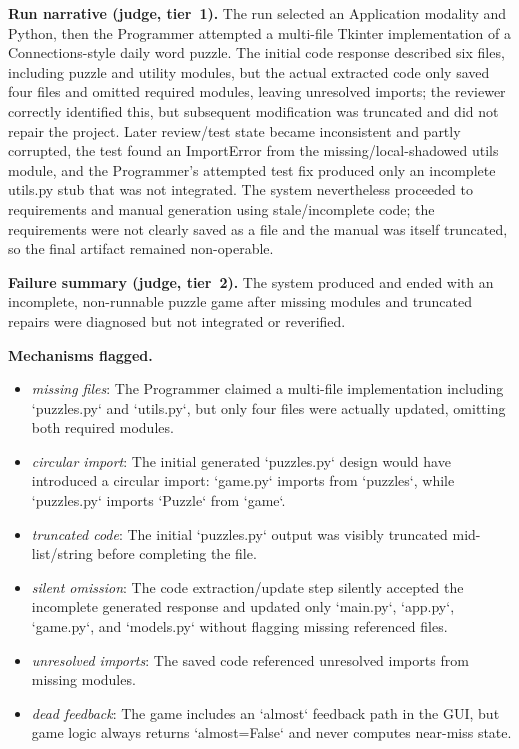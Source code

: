 \textbf{Run narrative (judge, tier~1).} The run selected an Application modality and Python, then the Programmer attempted a multi-file Tkinter implementation of a Connections-style daily word puzzle. The initial code response described six files, including puzzle and utility modules, but the actual extracted code only saved four files and omitted required modules, leaving unresolved imports; the reviewer correctly identified this, but subsequent modification was truncated and did not repair the project. Later review/test state became inconsistent and partly corrupted, the test found an ImportError from the missing/local-shadowed utils module, and the Programmer's attempted test fix produced only an incomplete utils.py stub that was not integrated. The system nevertheless proceeded to requirements and manual generation using stale/incomplete code; the requirements were not clearly saved as a file and the manual was itself truncated, so the final artifact remained non-operable.

\textbf{Failure summary (judge, tier~2).} The system produced and ended with an incomplete, non-runnable puzzle game after missing modules and truncated repairs were diagnosed but not integrated or reverified.

\textbf{Mechanisms flagged.}
\begin{itemize}
  \item \emph{missing files}: The Programmer claimed a multi-file implementation including `puzzles.py` and `utils.py`, but only four files were actually updated, omitting both required modules.
  \item \emph{circular import}: The initial generated `puzzles.py` design would have introduced a circular import: `game.py` imports from `puzzles`, while `puzzles.py` imports `Puzzle` from `game`.
  \item \emph{truncated code}: The initial `puzzles.py` output was visibly truncated mid-list/string before completing the file.
  \item \emph{silent omission}: The code extraction/update step silently accepted the incomplete generated response and updated only `main.py`, `app.py`, `game.py`, and `models.py` without flagging missing referenced files.
  \item \emph{unresolved imports}: The saved code referenced unresolved imports from missing modules.
  \item \emph{dead feedback}: The game includes an `almost` feedback path in the GUI, but game logic always returns `almost=False` and never computes near-miss state.
\end{itemize}


